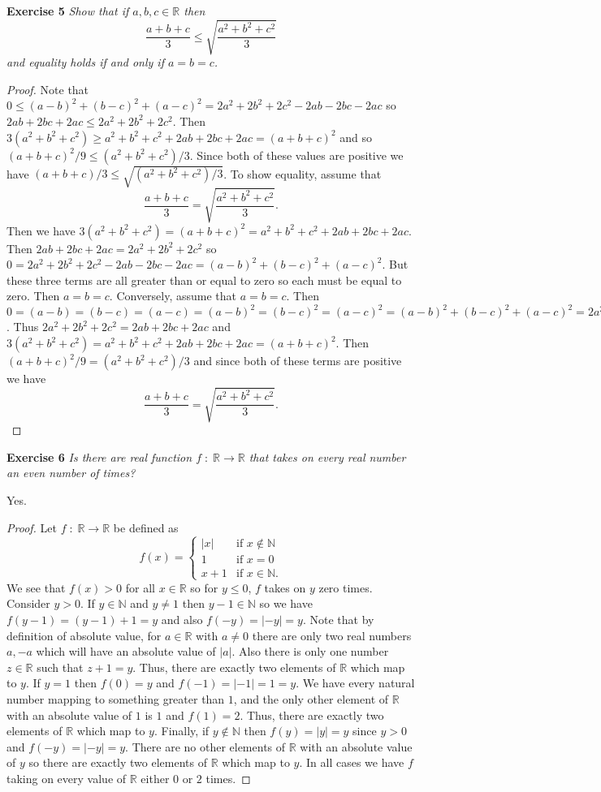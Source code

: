 \documentclass{article}
\begin{document}
\begin{flushleft}
\textbf{Exercise 5}
\textsl{Show that if $a,b,c \in \mathbb{R}$ then
\[
\frac{a+b+c}{3} \leq \sqrt{\frac{a^2+b^2+c^2}{3}}
\]
and equality holds if and only if $a=b=c$.}
\begin{proof}
Note that $0 \leq (a-b)^2 + (b-c)^2 + (a-c)^2 = 2a^2 + 2b^2 + 2c^2 - 2ab - 2bc - 2ac$ so $2ab + 2bc + 2ac \leq 2a^2 + 2b^2 + 2c^2$. Then $3(a^2+b^2+c^2) \geq a^2+b^2+c^2+2ab+2bc+2ac=(a+b+c)^2$ and so $(a+b+c)^2/9 \leq (a^2+b^2+c^2)/3$. Since both of these values are positive we have $(a+b+c)/3 \leq \sqrt{(a^2+b^2+c^2)/3}$. To show equality, assume that
\[
\frac{a+b+c}{3} = \sqrt{\frac{a^2+b^2+c^2}{3}}.
\]
Then we have $3(a^2+b^2+c^2) = (a+b+c)^2 = a^2+b^2+c^2+2ab+2bc+2ac$. Then $2ab+2bc+2ac=2a^2+2b^2+2c^2$ so $0=2a^2+2b^2+2c^2-2ab-2bc-2ac=(a-b)^2+(b-c)^2+(a-c)^2$. But these three terms are all greater than or equal to zero so each must be equal to zero. Then $a=b=c$. Conversely, assume that $a=b=c$. Then $0=(a-b)=(b-c)=(a-c)=(a-b)^2=(b-c)^2=(a-c)^2=(a-b)^2+(b-c)^2+(a-c)^2=2a^2+2b^2+2c^2-2ab-2bc-2ac$. Thus $2a^2+2b^2+2c^2=2ab+2bc+2ac$ and $3(a^2+b^2+c^2)=a^2+b^2+c^2+2ab+2bc+2ac=(a+b+c)^2$. Then $(a+b+c)^2/9 = (a^2+b^2+c^2)/3$ and since both of these terms are positive we have
\[
\frac{a+b+c}{3} = \sqrt{\frac{a^2+b^2+c^2}{3}}.
\]
\end{proof}

\textbf{Exercise 6}
\textsl{Is there are real function $f \; : \; \mathbb{R} \rightarrow \mathbb{R}$ that takes on every real number an even number of times?}\newline

Yes.
\begin{proof}
Let $f \; : \; \mathbb{R} \rightarrow \mathbb{R}$ be defined as
\[
f(x) = 
\begin{cases}
|x| & \text{if $x \notin \mathbb{N}$} \\
1 & \text{if $x=0$} \\
x+1 & \text{if $x \in \mathbb{N}$}.
\end{cases}
\]
We see that $f(x)>0$ for all $x \in \mathbb{R}$ so for $y \leq 0$, $f$ takes on $y$ zero times. Consider $y>0$. If $y \in \mathbb{N}$ and $y \neq 1$ then $y-1 \in \mathbb{N}$ so we have $f(y-1)=(y-1)+1=y$ and also $f(-y)=|-y|=y$. Note that by definition of absolute value, for $a \in \mathbb{R}$ with $a \neq 0$ there are only two real numbers $a,-a$ which will have an absolute value of $|a|$. Also there is only one number $z \in \mathbb{R}$ such that $z+1=y$. Thus, there are exactly two elements of $\mathbb{R}$ which map to $y$. If $y=1$ then $f(0) = y$ and $f(-1)=|-1|=1=y$. We have every natural number mapping to something greater than $1$, and the only other element of $\mathbb{R}$ with an absolute value of $1$ is $1$ and $f(1)=2$. Thus, there are exactly two elements of $\mathbb{R}$ which map to $y$. Finally, if $y \notin \mathbb{N}$ then $f(y)=|y|=y$ since $y>0$ and $f(-y)=|-y|=y$. There are no other elements of $\mathbb{R}$ with an absolute value of $y$ so there are exactly two elements of $\mathbb{R}$ which map to $y$. In all cases we have $f$ taking on every value of $\mathbb{R}$ either $0$ or $2$ times.
\end{proof}

\end{flushleft}
\end{document}
